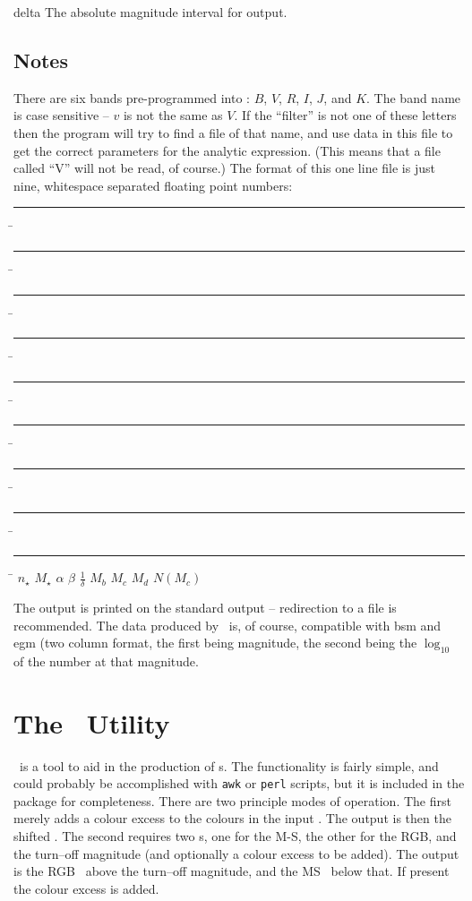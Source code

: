 \documentclass[11pt,twoside]{article}
\begin{document}
\begin{clo}{delta}
The absolute magnitude interval for output.
\end{clo}

\subsection*{Notes}

There are six bands pre-programmed into \mkalf : $B$, $V$, $R$, $I$, $J$,
and $K$. The band name is case sensitive -- $v$ is not the same as $V$. If the 
``filter'' is not one of these letters then the program will try to find a 
file of that name, and use data in this file to get the correct parameters for 
the analytic expression. (This means that a file called ``V'' will not be 
read, of course.) The format of this one line file is just nine, whitespace
separated floating point numbers:

\begin{tabbing}
\rule{1cm}{0cm} \= \rule{1cm}{0cm} \= \rule{1cm}{0cm} \= \rule{1cm}{0cm} \= \rule{1cm}{0cm} \= \rule{1cm}{0cm} \= \rule{1cm}{0cm} \= \rule{1cm}{0cm} \= \rule{1cm}{0cm} \= \kill
$n_\star$ \> $M_\star$ \> $\alpha$ \> $\beta$ \> $\frac{1}{\delta}$ 
\> $M_b$ \> $M_c$ \> $M_d$ \> $N(M_c)$
\end{tabbing}

The output is printed on the standard output -- redirection to a file is 
recommended. The data produced by \mkalf\ is, of course, compatible with 
{\sc bsm} and {\sc egm} (two column format, the first being magnitude, the
second being the $\log_{10}$ of the number at that magnitude.


\newpage
\section{The \mkcmd\ Utility}

\mkcmd\ is a tool to aid in the production of \cmd s. The functionality is 
fairly simple, and could probably be accomplished with {\tt awk} or {\tt perl}
scripts, but it is included in the package for completeness. There are two
principle modes of operation. The first merely adds a colour excess to the
colours in the input \cmd. The output is then the shifted \cmd. The second 
requires two \cmd s, one for the M-S, the other for the RGB, and the turn--off
magnitude (and optionally a colour excess to be added). The output is the
RGB \cmd\ above the turn--off magnitude, and the MS \cmd\ below that. If 
present the colour excess is added.
\end{document}

